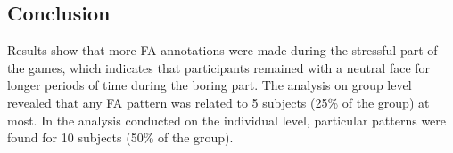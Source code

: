 \subsection{Conclusion}


Results show that more FA annotations were made during the stressful part of the games, which indicates that participants remained with a neutral face for longer periods of time during the boring part. The analysis on group level revealed that any FA pattern was related to 5 subjects (25\% of the group) at most. In the analysis conducted on the individual level, particular patterns were found for 10 subjects (50\% of the group).

